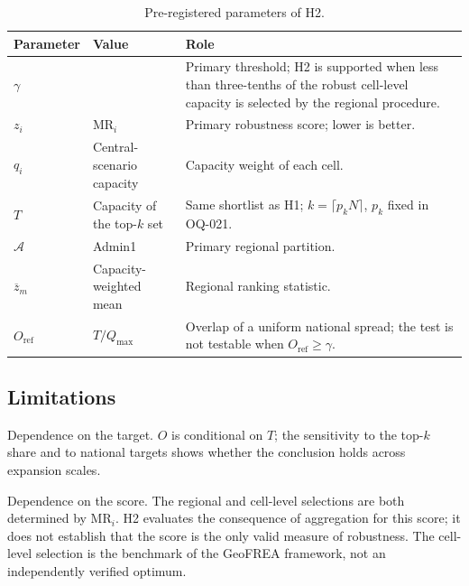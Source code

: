 \begin{table}[htbp]
    \centering
    \caption{Pre-registered parameters of H2.}
    \label{tab:h2_parameters}
    \small
    \renewcommand{\arraystretch}{1.2}
    \begin{tabularx}{\textwidth}{
        @{}
        >{\raggedright\arraybackslash}p{2.4cm}
        >{\raggedright\arraybackslash}p{3.0cm}
        >{\raggedright\arraybackslash}X
        @{}
    }
        \toprule
        \textbf{Parameter} & \textbf{Value} & \textbf{Role} \\
        \midrule
        $\gamma$ & 0.30 & Primary threshold; H2 is supported when less than
        three-tenths of the robust cell-level capacity is selected by the
        regional procedure. \\
        \addlinespace
        $z_i$ & $\mathrm{MR}_i$ & Primary robustness score; lower is better. \\
        \addlinespace
        $q_i$ & Central-scenario capacity & Capacity weight of each cell. \\
        \addlinespace
        $T$ & Capacity of the top-$k$ set & Same shortlist as H1;
        $k=\lceil p_k N\rceil$, $p_k$ fixed in OQ-021. \\
        \addlinespace
        $\mathcal{A}$ & Admin1 & Primary regional partition. \\
        \addlinespace
        $\overline{z}_m$ & Capacity-weighted mean & Regional ranking
        statistic. \\
        \addlinespace
        $O_{\mathrm{ref}}$ & $T/Q_{\max}$ & Overlap of a uniform national
        spread; the test is not testable when $O_{\mathrm{ref}}\geq\gamma$. \\
        \bottomrule
    \end{tabularx}
\end{table}

\subsection{Limitations}
\label{subsec:h2_limitations}

Dependence on the target. $O$ is conditional on $T$; the sensitivity to the
top-$k$ share and to national targets shows whether the conclusion holds across
expansion scales.

Dependence on the score. The regional and cell-level selections are both
determined by $\mathrm{MR}_i$. H2 evaluates the consequence of aggregation for
this score; it does not establish that the score is the only valid measure of
robustness. The cell-level selection is the benchmark of the GeoFREA framework,
not an independently verified optimum.

